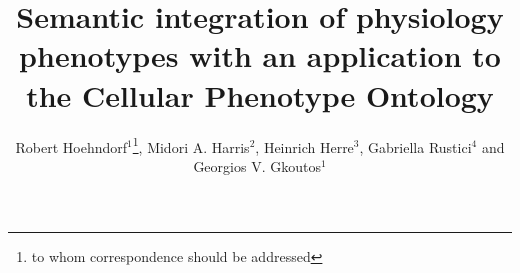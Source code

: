 \documentclass{bioinfo}
\begin{document}

\title[Physiology phenotypes]{Semantic integration of physiology
  phenotypes with an application to the Cellular Phenotype Ontology}

\author[Hoehndorf \textit{et~al}]{Robert Hoehndorf$^{1}$\footnote{to
    whom correspondence should be addressed}, Midori
  A. Harris$^2$, Heinrich Herre$^3$, Gabriella Rustici$^4$ and
  Georgios V. Gkoutos$^{1}$}

\address{$^{1}$Department of Genetics, University of Cambridge,
  Downing Street, Cambridge, Cambridge CB2 3EH, UK\\
  $^{2}$Department of Biochemistry; University of Cambridge, 80 Tennis
  Court Road, Cambridge CB2 1GA, UK\\
  $^{3}$Institute for Medical Informatics, Statistics and
  Epidemiology, University of Leipzig, Haertelstrasse 16-18, 04107
  Leipzig, Germany\\
  $^{4}$European Bioinformatics Institute, Wellcome Trust Genome
  Campus, Hinxton, Cambridge, Cambridge CB10 1SD, UK}



\maketitle
\end{document}
